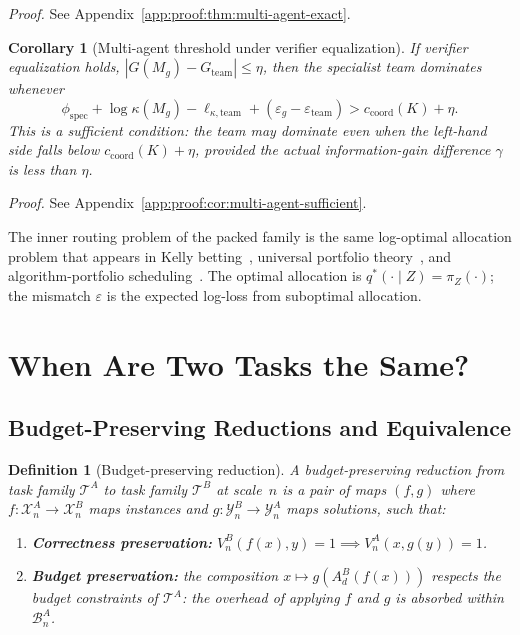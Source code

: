 \documentclass[10pt]{article}
\theoremstyle{paperplain}
\newtheorem{corollary}[theorem]{Corollary}
\theoremstyle{paperdefinition}
\newtheorem{definition}[theorem]{Definition}
\theoremstyle{paperremark}
\newcommand{\cX}{\mathcal{X}}
\newcommand{\cY}{\mathcal{Y}}
\newcommand{\cT}{\mathcal{T}}
\newcommand{\cB}{\mathcal{B}}
\begin{document}
\par\noindent\emph{Proof.} See Appendix~\ref{app:proof:thm:multi-agent-exact}.\par


\begin{corollary}[Multi-agent threshold under verifier equalization]
\label{cor:multi-agent-sufficient}
If verifier equalization holds, $|G(M_g) - G_{\mathrm{team}}| \le \eta$, then the specialist team dominates whenever
\[
\phi_{\mathrm{spec}}
+ \log\kappa(M_g)-\ell_{\kappa,\mathrm{team}}
+ (\varepsilon_g - \varepsilon_{\mathrm{team}})
> c_{\mathrm{coord}}(K) + \eta.
\]
This is a \emph{sufficient} condition: the team may dominate even when the left-hand side falls below $c_{\mathrm{coord}}(K) + \eta$, provided the actual information-gain difference $\gamma$ is less than $\eta$.
\end{corollary}

\par\noindent\emph{Proof.} See Appendix~\ref{app:proof:cor:multi-agent-sufficient}.\par


The inner routing problem of the packed family is the same log-optimal allocation problem that appears in Kelly betting~\cite{kelly1956}, universal portfolio theory~\cite{cover-thomas2006}, and algorithm-portfolio scheduling~\cite{gomes-selman2001}. The optimal allocation is $q^*(\cdot \mid Z)=\pi_Z(\cdot)$; the mismatch $\varepsilon$ is the expected log-loss from suboptimal allocation.

\section{When Are Two Tasks the Same?}
\label{sec:equivalence}

\subsection{Budget-Preserving Reductions and Equivalence}
\label{subsec:task-equiv-def}

\begin{definition}[Budget-preserving reduction]
\label{def:budget-preserving-reduction}
A \emph{budget-preserving reduction} from task family $\cT^A$ to task family $\cT^B$ at scale~$n$ is a pair of maps $(f,g)$ where $f: \cX^A_n \to \cX^B_n$ maps instances and $g: \cY^B_n \to \cY^A_n$ maps solutions, such that:
\begin{enumerate}
\item \textbf{Correctness preservation:} $V^B_n(f(x), y) = 1 \implies V^A_n(x, g(y)) = 1$.
\item \textbf{Budget preservation:} the composition $x \mapsto g(A_d^B(f(x)))$ respects the budget constraints of $\cT^A$: the overhead of applying $f$ and $g$ is absorbed within $\cB^A_n$.
\end{enumerate}
\end{definition}
\end{document}
